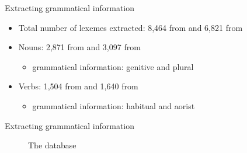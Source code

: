 \begin{frame}{Extracting grammatical information}
\begin{itemize}
    \item Total number of lexemes extracted: 8,464 from \citet{saidovaabusov2012} and 6,821 from \citet{alekseev2019}
    \item Nouns: 2,871 from \citet{saidovaabusov2012} and 3,097 from \citet{alekseev2019}
    \begin{itemize}
        \item grammatical information: genitive and plural
    \end{itemize}
    \item Verbs: 1,504 from \citet{saidovaabusov2012} and 1,640 from \citet{alekseev2019}
    \begin{itemize}
        \item grammatical information: habitual and aorist
    \end{itemize}
\end{itemize}
\end{frame}

\begin{frame}{Extracting grammatical information}
\begin{figure}[h]
\centering
{}
\caption{The database}
\end{figure}
\end{frame}

